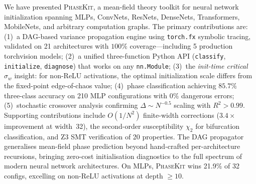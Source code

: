 \documentclass[10pt]{article}
\newcommand{\ToolName}{\textsc{PhaseKit}}
\begin{document}
We have presented \ToolName{}, a mean-field theory toolkit for neural network initialization spanning MLPs, ConvNets, ResNets, DenseNets, Transformers, MobileNets, and arbitrary computation graphs.
The primary contributions are: (1)~a DAG-based variance propagation engine using \texttt{torch.fx} symbolic tracing, validated on 21 architectures with $100\%$ coverage---including 5 production torchvision models; (2)~a unified three-function Python API (\texttt{classify}, \texttt{initialize}, \texttt{diagnose}) that works on any \texttt{nn.Module}; (3)~the \emph{init-time critical $\sigma_w$} insight: for non-ReLU activations, the optimal initialization scale differs from the fixed-point edge-of-chaos value; (4)~phase classification achieving $85.7\%$ three-class accuracy on 210 MLP configurations with $0\%$ dangerous errors; (5)~stochastic crossover analysis confirming $\Delta \sim N^{-0.5}$ scaling with $R^2 > 0.99$.
Supporting contributions include $O(1/N^2)$ finite-width corrections ($3.4\times$ improvement at width~32), the second-order susceptibility $\chi_2$ for bifurcation classification, and Z3 SMT verification of 20 properties.
The DAG propagator generalises mean-field phase prediction beyond hand-crafted per-architecture recursions, bringing zero-cost initialisation diagnostics to the full spectrum of modern neural network architectures.
On MLPs, \ToolName{} wins 21.9\% of 32 configs, excelling on non-ReLU activations at depth $\geq 10$.


\end{document}

